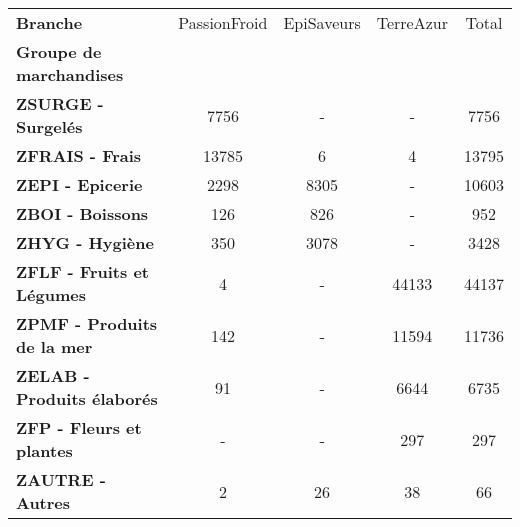 \begin{tabular}{lcccc}
\toprule
\textbf{Branche} & PassionFroid & EpiSaveurs & TerreAzur &  Total \\
\textbf{Groupe de marchandises   } &              &            &           &        \\
\midrule
\textbf{ZSURGE - Surgelés        } &         7756 &          - &         - &   7756 \\
\textbf{ZFRAIS - Frais           } &        13785 &          6 &         4 &  13795 \\
\textbf{ZEPI - Epicerie          } &         2298 &       8305 &         - &  10603 \\
\textbf{ZBOI - Boissons          } &          126 &        826 &         - &    952 \\
\textbf{ZHYG - Hygiène           } &          350 &       3078 &         - &   3428 \\
\textbf{ZFLF - Fruits et Légumes } &            4 &          - &     44133 &  44137 \\
\textbf{ZPMF - Produits de la mer} &          142 &          - &     11594 &  11736 \\
\textbf{ZELAB - Produits élaborés} &           91 &          - &      6644 &   6735 \\
\textbf{ZFP - Fleurs et plantes  } &            - &          - &       297 &    297 \\
\textbf{ZAUTRE - Autres          } &            2 &         26 &        38 &     66 \\
\bottomrule
\end{tabular}
